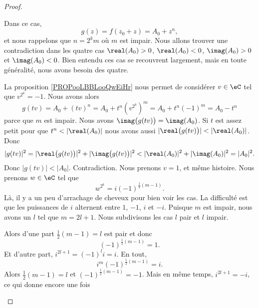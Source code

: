 \begin{proof}
\begin{subproof}
		\spitem[Si \( r=n\)]

		Dans ce cas,
		\begin{equation}
			g(z)=f(z_0+z)=A_0+z^n,
		\end{equation}
		et nous rappelons que \( n=2^km\) où \( m\) est impair. Nous allons trouver une contradiction dans les quatre cas \( \real(A_0)>0\), \( \real(A_0)<0\), \( \imag(A_0)>0\) et \( \imag(A_0)<0\). Bien entendu ces cas se recouvrent largement, mais en toute généralité, nous avons besoin des quatre.
		\begin{subproof}
			\spitem[Si \( \real(A_0)>0\)]
			La proposition \ref{PROPooLBBLooQwEiHr} nous permet de considérer \( v\in \eC\) tel que \( v^{2^k}=-1\). Nous avons alors
			\begin{equation}
				g(tv)=A_0+(tv)^n=A_0+t^n(v^{2^k})^m=A_0+t^n(-1)^m=A_0-t^n
			\end{equation}
			parce que \( m\) est impair. Nous avons \( \imag\big( g(tv) \big)=\imag(A_0)\). Si \( t\) est assez petit pour que \( t^n<| \real(A_0) |\) nous avons aussi \( |\real\big( g(tv) \big)|<| \real(A_0) |\). Donc
			\begin{equation}
				| g(tv) |^2=| \real\big( g(tv) \big) |^2+| \imag\big( g(tv) \big) |^2 < | \real(A_0) |^2+| \imag(A_0) |^2=| A_0 |^2.
			\end{equation}
			Donc \( | g(tv) |<| A_0 |\). Contradiction.
			\spitem[Si \( \real(A_0)<0\)]
			Nous prenons \( v=1\), et même histoire.
			\spitem[Si \( \imag(A_0)<0\)]
			Nous prenons \( w\in \eC\) tel que
			\begin{equation}
				w^{2^k}=i(-1)^{\frac{ 1 }{2}(m-1)}.
			\end{equation}
			Là, il y a un peu d'arrachage de cheveux pour bien voir les cas. La difficulté est que les puissances de \( i\) alternent entre \( 1\), \( -1\), \( i\) et \( -i\). Puisque \( m\) est impair, nous avons un \( l\) tel que \( m=2l+1\). Nous subdivisons les cas \( l\) pair et \( l\) impair.
			\begin{subproof}
				Alors d'une part \( \frac{ 1 }{2}(m-1)=l\) est pair et donc
				\begin{equation}
					(-1)^{\frac{ 1 }{2}(m-1)}=1.
				\end{equation}
				Et d'autre part, \( i^{2l+1}=(-1)^li=i\). En tout,
				\begin{equation}
					i^m(-1)^{\frac{ 1 }{2}(m-1)}=i.
				\end{equation}
				Alors \( \frac{ 1 }{2}(m-1)=l\) et \( (-1)^{\frac{ 1 }{2}(m-1)}=-1\). Mais en même temps, \( i^{2l+1}=-i\), ce qui donne encore une fois

\end{subproof}
\end{subproof}
\end{subproof}
\end{proof}

